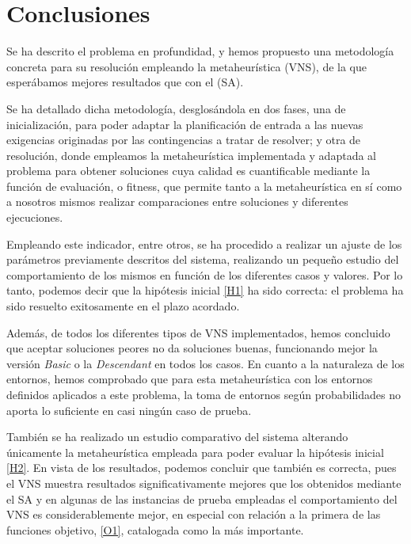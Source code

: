 \graphicspath{{capitulos/Capitulo6-Conclusiones/recursos/}}


\section{Conclusiones} \label{capitulo:6}

Se ha descrito el problema en profundidad, y hemos propuesto una metodología concreta para su resolución empleando la metaheurística \vns{} (VNS), de la que esperábamos mejores resultados que con el \sa{} (SA). 

Se ha detallado dicha metodología, desglosándola en dos fases, una de inicialización, para poder adaptar la planificación de entrada a las nuevas exigencias originadas por las contingencias a tratar de resolver; y otra de resolución, donde empleamos la metaheurística implementada y adaptada al problema para obtener soluciones cuya calidad es cuantificable mediante la función de evaluación, o fitness, que permite tanto a la metaheurística en sí como a nosotros mismos realizar comparaciones entre soluciones y diferentes ejecuciones. 

Empleando este indicador, entre otros, se ha procedido a realizar un ajuste de los parámetros previamente descritos del sistema, realizando un pequeño estudio del comportamiento de los mismos en función de los diferentes casos y valores. Por lo tanto, podemos decir que la hipótesis inicial \ref{H1} ha sido correcta: el problema ha sido resuelto exitosamente en el plazo acordado.

Además, de todos los diferentes tipos de VNS implementados, hemos concluido que aceptar soluciones peores no da soluciones buenas, funcionando mejor la versión \textit{Basic} o la \textit{Descendant} en todos los casos. En cuanto a la naturaleza de los entornos, hemos comprobado que para esta metaheurística con los entornos definidos aplicados a este problema, la toma de entornos según probabilidades no aporta lo suficiente en casi ningún caso de prueba.

También se ha realizado un estudio comparativo del sistema alterando únicamente la metaheurística empleada para poder evaluar la hipótesis inicial \ref{H2}. En vista de los resultados, podemos concluir que también es correcta, pues el VNS muestra resultados significativamente mejores que los obtenidos mediante el SA y en algunas de las instancias de prueba empleadas el comportamiento del VNS es considerablemente mejor, en especial con relación a la primera de las funciones objetivo, \ref{O1}, catalogada como la más importante.

